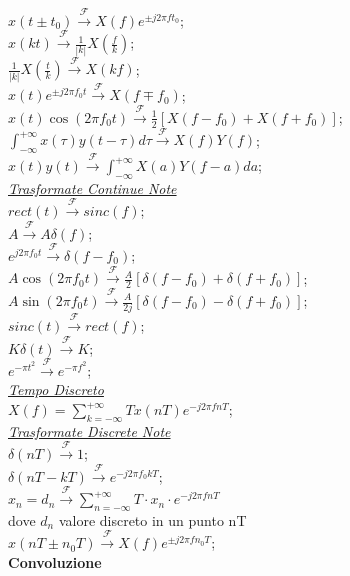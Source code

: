 \documentclass[a4paper]{article}
\begin{document}
\begin{multicols*}{3}
$x(t{\pm}t_0) \xrightarrow{\mathscr{F}} X(f)e^{{\pm}j2{\pi}f{t_0}}$; \\
$x(kt) \xrightarrow{\mathscr{F}} \frac{1}{|k|}X(\frac{f}{k})$; \\
$\frac{1}{|k|}X(\frac{t}{k}) \xrightarrow{\mathscr{F}} X(kf)$; \\
$x(t)e^{{\pm}j2{\pi}{f_0}t} \xrightarrow{\mathscr{F}} X(f{\mp}f_0)$; \\
$x(t)\cos(2{\pi}{f_0}t) \xrightarrow{\mathscr{F}} \frac{1}{2}[X(f - f_0) + X(f + f_0)]$; \\
$\int_{-\infty}^{+\infty}x(\tau)y(t - \tau) d\tau \xrightarrow{\mathscr{F}} X(f)Y(f)$; \\
$x(t)y(t) \xrightarrow{\mathscr{F}} \int_{-\infty}^{+\infty}X(a)Y(f - a) da$; \\
\underline{\textit{Trasformate Continue Note}} \\
$rect(t) \xrightarrow{\mathscr{F}} sinc(f)$; \\
$A \xrightarrow{\mathscr{F}} A\delta (f)$; \\
$e^{j2{\pi}f_{0}t} \xrightarrow{\mathscr{F}} \delta (f-f_0)$; \\
$A\cos(2{\pi}f_{0}t) \xrightarrow{\mathscr{F}} {\frac{A}{2}}[\delta(f-f_0) + \delta(f+f_0)]$; \\
$A\sin(2{\pi}f_{0}t) \xrightarrow{\mathscr{F}} {\frac{A}{2j}}[\delta(f-f_0) - \delta(f+f_0)]$; \\
$sinc(t) \xrightarrow{\mathscr{F}} rect(f)$; \\
$K\delta(t) \xrightarrow{\mathscr{F}} K$; \\
$e^{-\pi{t^2}} \xrightarrow{\mathscr{F}} e^{-\pi{f^2}}$; \\
\underline{\textit{Tempo Discreto}} \\
$X(f) = \sum_{k=-\infty}^{+\infty}{Tx(nT)e^{-j2\pi fnT}}$; \\
\underline{\textit{Trasformate Discrete Note}} \\
$\delta(nT) \xrightarrow{\mathscr{F}} 1$; \\
$\delta(nT - kT) \xrightarrow{\mathscr{F}} e^{-j2{\pi}{f_0}kT}$; \\
$x_n = d_n \xrightarrow{\mathscr{F}} \sum_{n=-\infty}^{+\infty}T\cdot x_n\cdot e^{-j2\pi fnT}$ \\
dove $d_n$ valore discreto in un punto nT \\
$x(nT{\pm}n_0T) \xrightarrow{\mathscr{F}} X(f)e^{{\pm}j2{\pi}f{n_0T}}$; \\
\textbf{Convoluzione} \\

\end{multicols*}
\end{document}
